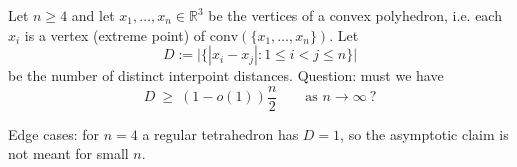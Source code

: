 Let $n\ge 4$ and let $x_1,\ldots,x_n\in\mathbb{R}^3$ be the vertices of a convex polyhedron,
i.e. each $x_i$ is a vertex (extreme point) of $\mathrm{conv}(\{x_1,\ldots,x_n\})$.
Let
\[
D:=\bigl|\bigl\{|x_i-x_j|:1\le i<j\le n\bigr\}\bigr|
\]
be the number of distinct interpoint distances. Question: must we have
\[
D\ \ge\ (1-o(1))\frac{n}{2}\qquad\text{as }n\to\infty\ ?
\]

Edge cases: for $n=4$ a regular tetrahedron has $D=1$, so the asymptotic claim is not meant for small $n$.
